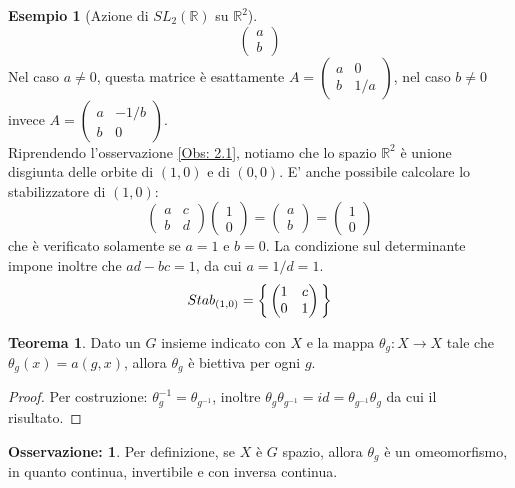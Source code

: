 \documentclass[12pt,a4paper]{report}
\theoremstyle{definition}
\theoremstyle{Theorem}
\newtheorem{Theo}[Def]{Teorema}
\theoremstyle{definition}
\newtheorem{Ex}[Def]{Esempio}
\theoremstyle{definition}
\theoremstyle{definition}
\newtheorem{Obs}[Def]{Osservazione:}
\begin{document}
\begin{Ex} [Azione di $SL_2(\mathbb{R})$ su $\mathbb{R}^2$]
$$\begin{pmatrix}
	a\\b
\end{pmatrix}$$
Nel caso $a\neq 0$, questa matrice è esattamente $A=\begin{pmatrix}
	a&0\\
	b&1/a
\end{pmatrix}$, nel caso $b\neq 0$ invece $A=\begin{pmatrix}
a&-1/b\\
b&0
\end{pmatrix}$.\\
Riprendendo l'osservazione \ref{Obs: 2.1}, notiamo che lo spazio $\mathbb{R}^2$ è unione disgiunta delle orbite di $(1,0)$ e di $(0,0)$.
E' anche possibile calcolare lo stabilizzatore di $(1,0)$:
$$\begin{pmatrix}
	a&c\\
	b&d
\end{pmatrix}\begin{pmatrix}
1\\0
\end{pmatrix}=\begin{pmatrix}
a\\b
\end{pmatrix}=\begin{pmatrix}
1\\0
\end{pmatrix}$$
che è verificato solamente se $a=1$ e $b=0$. La condizione sul determinante impone inoltre che $ad-bc=1$, da cui $a=1/d=1$.
$$Stab_{(1,0)}=\bigg{\{}\begin{pmatrix}
	1&c\\
	0&1
\end{pmatrix}\bigg{\}}$$
\end{Ex}
\begin{Theo}
	Dato un $G$ insieme indicato con $X$ e la mappa $\theta_g:X\rightarrow X$ tale che $\theta_g(x)=a(g,x)$, allora $\theta_g$ è biettiva per ogni $g$.
\end{Theo}
\begin{proof}
	Per costruzione: $\theta_g^{-1}=\theta_{g^{-1}}$, inoltre $\theta_g\theta_{g^{-1}}=id=\theta_{g^{-1}}\theta_g$ da cui il risultato.
\end{proof}
\begin{Obs}
	Per definizione, se $X$ è $G$ spazio, allora $\theta_g$ è un omeomorfismo, in quanto continua, invertibile e con inversa continua.
\end{Obs}
\end{document}
